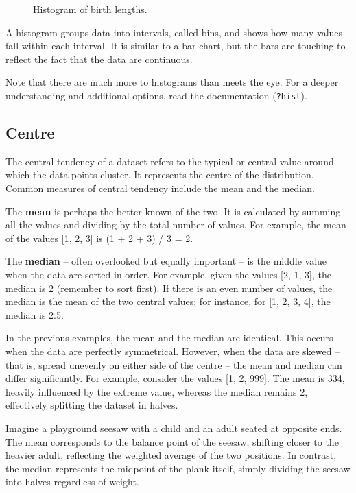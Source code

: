 \documentclass[
]{book}
\makeatletter
\newcommand*\pandocbounded[1]{%
  \sbox\pandoc@box{#1}%
  \Gscale@div\@tempa{\textheight}{\dimexpr\ht\pandoc@box+\dp\pandoc@box\relax}%
  \Gscale@div\@tempb{\linewidth}{\wd\pandoc@box}%
  \ifdim\@tempb\p@<\@tempa\p@\let\@tempa\@tempb\fi%
  \ifdim\@tempa\p@<\p@\scalebox{\@tempa}{\usebox\pandoc@box}%
  \else\usebox{\pandoc@box}%
  \fi%
}
\makeatother
\begin{document}
\begin{figure}
\centering
\pandocbounded{}
\caption{\label{fig:stat-hist1}Histogram of birth lengths.}
\end{figure}

A histogram groups data into intervals, called bins, and shows how many values fall within each interval. It is similar to a bar chart, but the bars are touching to reflect the fact that the data are continuous.

Note that there are much more to histograms than meets the eye. For a deeper understanding and additional options, read the documentation (\texttt{?hist}).

\subsection{Centre}\label{centre}

The central tendency of a dataset refers to the typical or central value around which the data points cluster. It represents the centre of the distribution. Common measures of central tendency include the mean and the median.

The \textbf{mean} is perhaps the better-known of the two. It is calculated by summing all the values and dividing by the total number of values. For example, the mean of the values {[}1, 2, 3{]} is (1 + 2 + 3) / 3 = 2.

The \textbf{median} -- often overlooked but equally important -- is the middle value when the data are sorted in order. For example, given the values {[}2, 1, 3{]}, the median is 2 (remember to sort first). If there is an even number of values, the median is the mean of the two central values; for instance, for {[}1, 2, 3, 4{]}, the median is 2.5.

In the previous examples, the mean and the median are identical. This occurs when the data are perfectly symmetrical. However, when the data are skewed -- that is, spread unevenly on either side of the centre -- the mean and median can differ significantly. For example, consider the values {[}1, 2, 999{]}. The mean is 334, heavily influenced by the extreme value, whereas the median remains 2, effectively splitting the dataset in halves.

Imagine a playground seesaw with a child and an adult seated at opposite ends. The mean corresponds to the balance point of the seesaw, shifting closer to the heavier adult, reflecting the weighted average of the two positions. In contrast, the median represents the midpoint of the plank itself, simply dividing the seesaw into halves regardless of weight.
\end{document}
